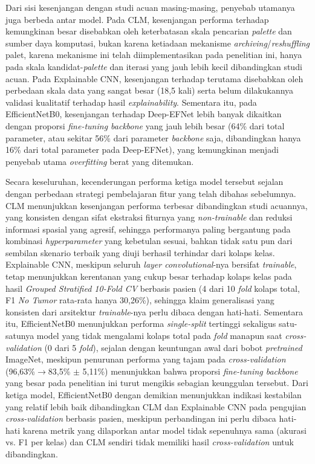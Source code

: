 Dari sisi kesenjangan dengan studi acuan masing-masing, penyebab utamanya juga berbeda antar model. Pada CLM, kesenjangan performa terhadap \textcite{wozniak2021deep} kemungkinan besar disebabkan oleh keterbatasan skala pencarian \textit{palette} dan sumber daya komputasi, bukan karena ketiadaan mekanisme \textit{archiving}/\textit{reshuffling} palet, karena mekanisme ini telah diimplementasikan pada penelitian ini, hanya pada skala kandidat-\textit{palette} dan iterasi yang jauh lebih kecil dibandingkan studi acuan. Pada Explainable CNN, kesenjangan terhadap \cite{iftikhar2025explainable} terutama disebabkan oleh perbedaan skala data yang sangat besar (18,5 kali) serta belum dilakukannya validasi kualitatif terhadap hasil \textit{explainability}. Sementara itu, pada EfficientNetB0, kesenjangan terhadap Deep-EFNet \cite{alshaari2025deepefnet} lebih banyak dikaitkan dengan proporsi \textit{fine-tuning backbone} yang jauh lebih besar (64\% dari total parameter, atau sekitar 56\% dari parameter \textit{backbone} saja, dibandingkan hanya 16\% dari total parameter pada Deep-EFNet), yang kemungkinan menjadi penyebab utama \textit{overfitting} berat yang ditemukan.

Secara keseluruhan, kecenderungan performa ketiga model tersebut sejalan dengan perbedaan strategi pembelajaran fitur yang telah dibahas sebelumnya. CLM menunjukkan kesenjangan performa terbesar dibandingkan studi acuannya, yang konsisten dengan sifat ekstraksi fiturnya yang \textit{non-trainable} dan reduksi informasi spasial yang agresif, sehingga performanya paling bergantung pada kombinasi \textit{hyperparameter} yang kebetulan sesuai, bahkan tidak satu pun dari sembilan skenario terbaik yang diuji berhasil terhindar dari kolaps kelas. Explainable CNN, meskipun seluruh \textit{layer convolutional}-nya bersifat \textit{trainable}, tetap menunjukkan kerentanan yang cukup besar terhadap kolaps kelas pada hasil \textit{Grouped Stratified 10-Fold CV} berbasis pasien (4 dari 10 \textit{fold} kolaps total, F1 \textit{No Tumor} rata-rata hanya 30,26\%), sehingga klaim generalisasi yang konsisten dari arsitektur \textit{trainable}-nya perlu dibaca dengan hati-hati. Sementara itu, EfficientNetB0 menunjukkan performa \textit{single-split} tertinggi sekaligus satu-satunya model yang tidak mengalami kolaps total pada \textit{fold} manapun saat \textit{cross-validation} (0 dari 5 \textit{fold}), sejalan dengan keuntungan awal dari bobot \textit{pretrained} ImageNet, meskipun penurunan performa yang tajam pada \textit{cross-validation} (96,63\%$\to$83,5\% $\pm$ 5,11\%) menunjukkan bahwa proporsi \textit{fine-tuning backbone} yang besar pada penelitian ini turut mengikis sebagian keunggulan tersebut. Dari ketiga model, EfficientNetB0 dengan demikian menunjukkan indikasi kestabilan yang relatif lebih baik dibandingkan CLM dan Explainable CNN pada pengujian \textit{cross-validation} berbasis pasien, meskipun perbandingan ini perlu dibaca hati-hati karena metrik yang dilaporkan antar model tidak sepenuhnya sama (akurasi vs. F1 per kelas) dan CLM sendiri tidak memiliki hasil \textit{cross-validation} untuk dibandingkan.

